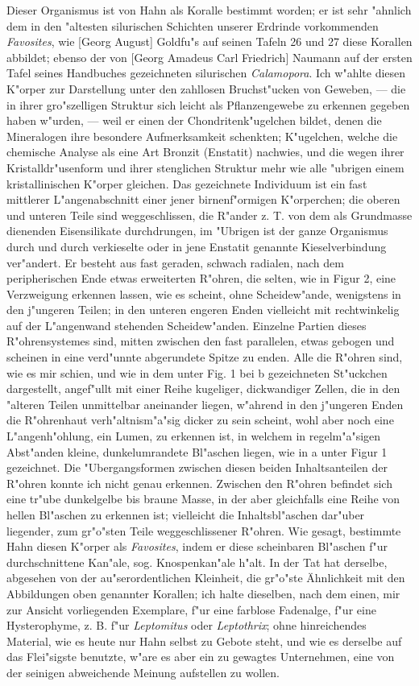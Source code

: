\documentclass[a4paper, 11pt, oneside]{article}
\begin{document}
Dieser Organismus ist von Hahn als Koralle bestimmt worden; er ist sehr "ahnlich dem in den "altesten silurischen Schichten unserer Erdrinde vorkommenden \emph{Favosites}, wie [Georg August] Goldfu"s auf seinen Tafeln 26 und 27 diese Korallen abbildet; ebenso der von [Georg Amadeus Carl Friedrich] Naumann auf der ersten Tafel seines Handbuches gezeichneten silurischen \emph{Calamopora}. Ich w"ahlte diesen K"orper zur Darstellung unter den zahllosen Bruchst"ucken von Geweben, --- die in ihrer gro"szelligen Struktur sich leicht als Pflanzengewebe zu erkennen gegeben haben w"urden, --- weil er einen der Chondritenk"ugelchen bildet, denen die Mineralogen ihre besondere Aufmerksamkeit schenkten; K"ugelchen, welche die chemische Analyse als eine Art Bronzit (Enstatit) nachwies, und die wegen ihrer Kristalldr"usenform und ihrer stenglichen Struktur mehr wie alle "ubrigen einem kristallinischen K"orper gleichen. Das gezeichnete Individuum ist ein fast mittlerer L"angenabschnitt einer jener birnenf"ormigen K"orperchen; die oberen und unteren Teile sind weggeschlissen, die R"ander z. T. von dem als Grundmasse dienenden Eisensilikate durchdrungen, im "Ubrigen ist der ganze Organismus durch und durch verkieselte oder in jene Enstatit genannte Kieselverbindung ver"andert. Er besteht aus fast geraden, schwach radialen, nach dem peripherischen Ende etwas erweiterten R"ohren, die selten, wie in Figur 2, eine Verzweigung erkennen lassen, wie es scheint, ohne Scheidew"ande, wenigstens in den j"ungeren Teilen; in den unteren engeren Enden vielleicht mit rechtwinkelig auf der L"angenwand stehenden Scheidew"anden. Einzelne Partien dieses R"ohrensystemes sind, mitten zwischen den fast parallelen, etwas gebogen und scheinen in eine verd"unnte abgerundete Spitze zu enden. Alle die R"ohren sind, wie es mir schien, und wie in dem unter Fig. 1 bei b gezeichneten St"uckchen dargestellt, angef"ullt mit einer Reihe kugeliger, dickwandiger Zellen, die in den "alteren Teilen unmittelbar aneinander liegen, w"ahrend in den j"ungeren Enden die R"ohrenhaut verh"altnism"a"sig dicker zu sein scheint, wohl aber noch eine L"angenh"ohlung, ein Lumen, zu erkennen ist, in welchem in regelm"a"sigen Abst"anden kleine, dunkelumrandete Bl"aschen liegen, wie in a unter Figur 1 gezeichnet. Die "Ubergangsformen zwischen diesen beiden Inhaltsanteilen der R"ohren konnte ich nicht genau erkennen. Zwischen den R"ohren befindet sich eine tr"ube dunkelgelbe bis braune Masse, in der aber gleichfalls eine Reihe von hellen Bl"aschen zu erkennen ist; vielleicht die Inhaltsbl"aschen dar"uber liegender, zum gr"o"sten Teile weggeschlissener R"ohren. Wie gesagt, bestimmte Hahn diesen K"orper als \emph{Favosites}, indem er diese scheinbaren Bl"aschen f"ur durchschnittene Kan"ale, sog. Knospenkan"ale h"alt. In der Tat hat derselbe, abgesehen von der au"serordentlichen Kleinheit, die gr"o"ste Ähnlichkeit mit den Abbildungen oben genannter Korallen; ich halte dieselben, nach dem einen, mir zur Ansicht vorliegenden Exemplare, f"ur eine farblose Fadenalge, f"ur eine Hysterophyme, z. B. f"ur \emph{Leptomitus} oder \emph{Leptothrix}; ohne hinreichendes Material, wie es heute nur Hahn selbst zu Gebote steht, und wie es derselbe auf das Flei"sigste benutzte, w"are es aber ein zu gewagtes Unternehmen, eine von der seinigen abweichende Meinung aufstellen zu wollen.
\end{document}
